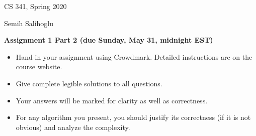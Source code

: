 \documentclass[11pt]{article}
\begin{document}

\hfill CS 341, Spring 2020\par
\hfill Semih Salihoglu

\bigskip
\begin{center}\large\bf Assignment 1 Part 2 (due Sunday, May 31, midnight EST)
\end{center}

\begin{itemize}
\item Hand in your assignment using Crowdmark. Detailed instructions are on the course website.
\item Give complete legible solutions to all questions.
\item Your answers will be marked for clarity as well as correctness.
\item For any algorithm you present, you should justify its correctness
(if it is not obvious) and analyze the complexity.
\end{itemize}
\end{document}
